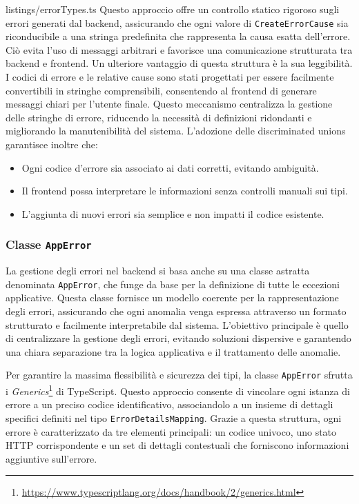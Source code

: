 
{listings/errorTypes.ts}
%
Questo approccio offre un controllo statico rigoroso sugli errori generati dal backend, assicurando che ogni valore di \texttt{CreateErrorCause} sia riconducibile a una stringa predefinita che rappresenta la causa esatta dell’errore. Ciò evita l’uso di messaggi arbitrari e favorisce una comunicazione strutturata tra backend e frontend.
%
Un ulteriore vantaggio di questa struttura è la sua leggibilità. I codici di errore e le relative cause sono stati progettati per essere facilmente convertibili in stringhe comprensibili, consentendo al frontend di generare messaggi chiari per l’utente finale. Questo meccanismo centralizza la gestione delle stringhe di errore, riducendo la necessità di definizioni ridondanti e migliorando la manutenibilità del sistema.
%
L’adozione delle discriminated unions garantisce inoltre che:
\begin{itemize}
  \item Ogni codice d’errore sia associato ai dati corretti, evitando ambiguità.
  \item Il frontend possa interpretare le informazioni senza controlli manuali sui tipi.
  \item L’aggiunta di nuovi errori sia semplice e non impatti il codice esistente.
\end{itemize}

\subsubsection{Classe \texttt{AppError}}
La gestione degli errori nel backend si basa anche su una classe astratta denominata \texttt{AppError}, che funge da base per la definizione di tutte le eccezioni applicative. Questa classe fornisce un modello coerente per la rappresentazione degli errori, assicurando che ogni anomalia venga espressa attraverso un formato strutturato e facilmente interpretabile dal sistema. L'obiettivo principale è quello di centralizzare la gestione degli errori, evitando soluzioni dispersive e garantendo una chiara separazione tra la logica applicativa e il trattamento delle anomalie.

Per garantire la massima flessibilità e sicurezza dei tipi, la classe \texttt{AppError} sfrutta i \textit{Generics}\footnote{\url{https://www.typescriptlang.org/docs/handbook/2/generics.html}} di TypeScript. Questo approccio consente di vincolare ogni istanza di errore a un preciso codice identificativo, associandolo a un insieme di dettagli specifici definiti nel tipo \texttt{ErrorDetailsMapping}. Grazie a questa struttura, ogni errore è caratterizzato da tre elementi principali: un codice univoco, uno stato HTTP corrispondente e un set di dettagli contestuali che forniscono informazioni aggiuntive sull'errore.

